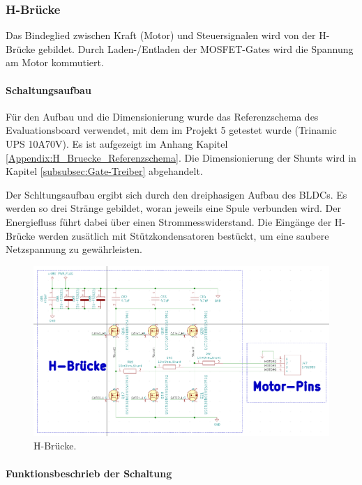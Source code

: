 \subsubsection{H-Brücke}
\label{subsubsec:H-Brücke}

Das Bindeglied zwischen Kraft (Motor) und Steuersignalen wird von der H-Brücke gebildet. Durch Laden-/Entladen der MOSFET-Gates wird die Spannung am Motor kommutiert.

\paragraph{Schaltungsaufbau}\mbox{}

Für den Aufbau und die Dimensionierung wurde das Referenzschema des Evaluationsboard verwendet, mit dem im Projekt 5 getestet wurde (Trinamic UPS 10A70V). Es ist aufgezeigt im Anhang Kapitel \ref{Appendix:H_Bruecke_Referenzschema}. Die Dimensionierung der Shunts wird in Kapitel \ref{subsubsec:Gate-Treiber} abgehandelt.

Der Schltungsaufbau ergibt sich durch den dreiphasigen Aufbau des BLDCs. Es werden so drei Stränge gebildet, woran jeweils eine Spule verbunden wird. Der Energiefluss führt dabei über einen Strommesswiderstand. Die Eingänge der H-Brücke werden zusätlich mit Stützkondensatoren bestückt, um eine saubere Netzspannung zu gewährleisten.

\begin{figure}[H]
	\centering
	\includegraphics[width=\textwidth]{graphics/Schema_H_Bruecke_und_BLDC}
	\caption{H-Brücke.}
	\label{fig:Schema_H_Bruecke_und_BLDC}
\end{figure}

\paragraph{Funktionsbeschrieb der Schaltung}\mbox{}


